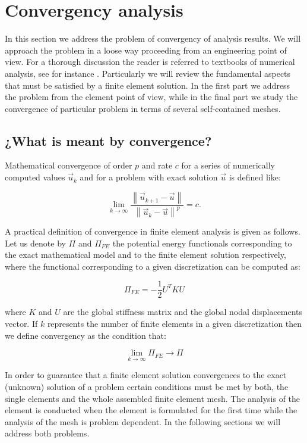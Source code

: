 \newpage
\chapter{Convergency analysis}
In this section we address the problem of convergency of analysis results. We will approach the problem in a loose way proceeding from an engineering point of view. For a thorough discussion the reader is referred to textbooks of numerical analysis, see for instance \citep{abaqus1989karlsson}. Particularly we will review the fundamental aspects that must be satisfied by a finite element solution. In the first part we address the problem from the element point of view, while in the final part we study the convergence of particular problem in terms of several self-contained meshes.

\section{¿What is meant by convergence?}
Mathematical convergence of order $p$ and rate $c$ for a series of numerically computed values $\vec u_{k}$ and for a problem with exact solution $\vec u$ is defined like:

\[\mathop {\lim }\limits_{k \to \infty } \frac{{\left\| {{{\vec u}_{k + 1}} - \vec u} \right\|}}{{{{\left\| {{{\vec u}_k} - \vec u} \right\|}^p}}} = c.\]

A practical definition of convergence in finite element analysis is given as follows. Let us denote by $\Pi$ and $\Pi _{FE}$ the potential energy functionals corresponding to the exact mathematical model and to the finite element solution respectively, where the functional corresponding to a given discretization can be computed as:

\[{\Pi _{FE}} =  - \frac{1}{2}{U^T}KU\]

where $K$ and $U$ are the global stiffness matrix and the global nodal displacements vector. If $k$ represents the number of finite elements in a given discretization then we define convergency as the condition that:

\begin{equation}
\mathop {\lim }\limits_{k \to \infty } {\Pi_{FE}} \to \Pi 
\label{convergence}
\end{equation}


In order to guarantee that a finite element solution convergences to the exact (unknown) solution of a problem certain conditions must be met by both, the single elements and the whole assembled finite element mesh. The analysis of the element is conducted when the element is formulated for the first time while the analysis of the mesh is problem dependent. In the following sections we will address both problems.

